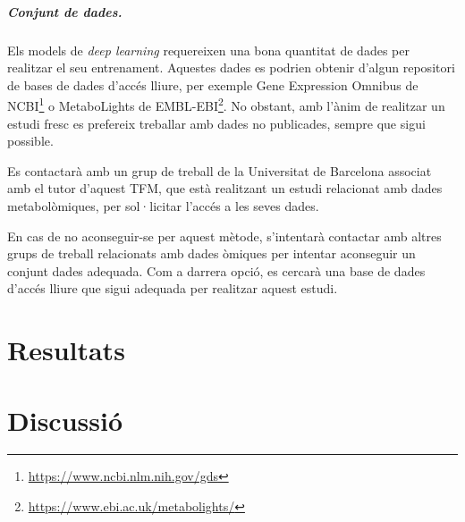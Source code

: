 \documentclass[CAT,BIB]{TFUOC}%
\begin{document}
    \paragraph{Conjunt de dades.}

        Els models de \textit{deep learning} requereixen una bona quantitat de dades per realitzar el seu entrenament. Aquestes dades es podrien obtenir d'algun repositori de bases de dades d'accés lliure, per exemple Gene Expression Omnibus de NCBI\footnote{\url{https://www.ncbi.nlm.nih.gov/gds}} o MetaboLights de EMBL-EBI\footnote{\url{https://www.ebi.ac.uk/metabolights/}}. No obstant, amb l'ànim de realitzar un estudi fresc es prefereix treballar amb dades no publicades, sempre que sigui possible.

        Es contactarà amb un grup de treball de la Universitat de Barcelona associat amb el tutor d'aquest TFM, que està realitzant un estudi relacionat amb dades metabolòmiques, per sol·licitar l'accés a les seves dades.

        En cas de no aconseguir-se per aquest mètode, s'intentarà contactar amb altres grups de treball relacionats amb dades òmiques per intentar aconseguir un conjunt dades adequada. Com a darrera opció, es cercarà una base de dades d'accés lliure que sigui adequada per realitzar aquest estudi.



\chapter{Resultats}

\chapter{Discussió}
\end{document}
